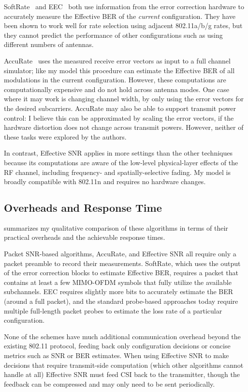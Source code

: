 SoftRate~\cite{Vutukuru_SoftRate} and EEC~\cite{Chen_EEC} both use information from the error correction hardware to accurately measure the Effective BER of the \emph{current} configuration. They have been shown to work well for rate selection using adjacent 802.11a/b/g rates, but they cannot predict the performance of other configurations such as using different numbers of antennas.

AccuRate~\cite{Sen_AccuRate} uses the measured receive error vectors as input to a full channel simulator; like my model this procedure can estimate the Effective BER of all modulations in the current configuration. However, these computations are computationally expensive and do not hold across antenna modes. One case where it may work is changing channel width, by only using the error vectors for the desired subcarriers. AccuRate may also be able to support transmit power control: I believe this can be approximated by scaling the error vectors, if the hardware distortion does not change across transmit powers. However, neither of these tasks were explored by the authors.

In contrast, Effective SNR applies in more settings than the other techniques because its computations are aware of the low-level physical-layer effects of the RF channel, including frequency- and spatially-selective fading. My model is broadly compatible with 802.11n and requires no hardware changes.

\subsection{Overheads and Response Time}
 summarizes my qualitative comparison of these algorithms in terms of their practical overheads and the achievable response times.

Packet SNR-based algorithms, AccuRate, and Effective SNR all require only a packet preamble to record their measurements. SoftRate, which uses the output of the error correction blocks to estimate Effective BER, requires a packet that contains at least a few MIMO-OFDM symbols that fully utilize the available subchannels. EEC requires slightly more bits to accurately estimate the BER (around a full packet), and the standard probe-based approaches today require multiple full-length packet probes to estimate the loss rate of a particular configuration.

None of the schemes have much additional communication overhead beyond the existing 802.11 protocol, feeding back only configuration decisions or concise metrics such as SNR or BER estimates. When using Effective SNR to make decisions that require transmit-side computation (which other algorithms cannot handle at all) Effective SNR must feed CSI back to the transmitter, though the feedback can be compressed and may only need to be sent periodically.

